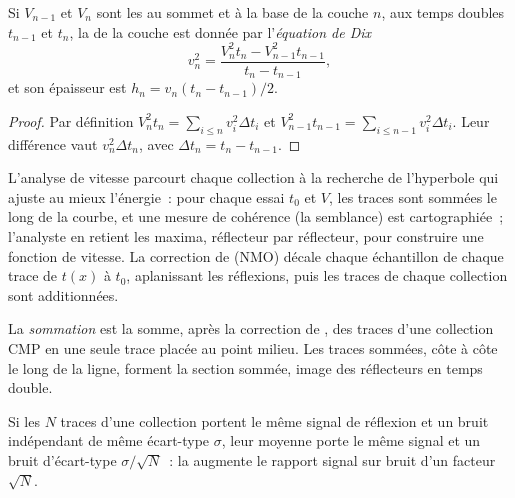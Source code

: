 \begin{theorem}\label{thm:b3:exploration-seismology:dix}
Si $V_{n-1}$ et $V_n$ sont les  au sommet et à la base de la
couche $n$, aux temps doubles $t_{n-1}$ et $t_n$, la  de la
couche est donnée par l'\emph{équation de Dix}
\[
  v_n^2 = \frac{V_n^2t_n - V_{n-1}^2t_{n-1}}{t_n - t_{n-1}} ,
\]
et son épaisseur est $h_n = v_n(t_n - t_{n-1})/2$.
\end{theorem}

\begin{proof}
Par définition $V_n^2t_n = \sum_{i\le n}v_i^2\Delta t_i$ et $V_{n-1}^2t_{n-1}
= \sum_{i\le n-1}v_i^2\Delta t_i$. Leur différence vaut $v_n^2\Delta t_n$, avec
$\Delta t_n = t_n - t_{n-1}$.
\end{proof}

L'analyse de vitesse parcourt chaque collection à la recherche de l'hyperbole qui ajuste au mieux
l'énergie~: pour chaque essai $t_0$ et $V$, les traces sont sommées le long de la courbe, et
une mesure de cohérence (la semblance) est cartographiée~; l'analyste en retient les maxima,
réflecteur par réflecteur, pour construire une fonction de vitesse. La correction de 
(NMO) décale chaque échantillon de chaque trace de $t(x)$ à $t_0$, aplanissant les
réflexions, puis les traces de chaque collection sont additionnées.

\begin{definition}\label{def:b3:exploration-seismology:stack}
La \emph{sommation} est la somme, après la
correction de , des traces d'une collection CMP en une seule trace
placée au point milieu. Les traces sommées, côte à côte le long de la ligne, forment
la section sommée, image des réflecteurs en temps double.
\end{definition}

\begin{proposition}\label{prop:b3:exploration-seismology:sqrtN}
Si les $N$ traces d'une collection portent le même signal de réflexion et un bruit indépendant
de même écart-type $\sigma$, leur moyenne porte le même signal
et un bruit d'écart-type $\sigma/\sqrt N$~: la  augmente le
rapport signal sur bruit d'un facteur $\sqrt N$.
\end{proposition}

